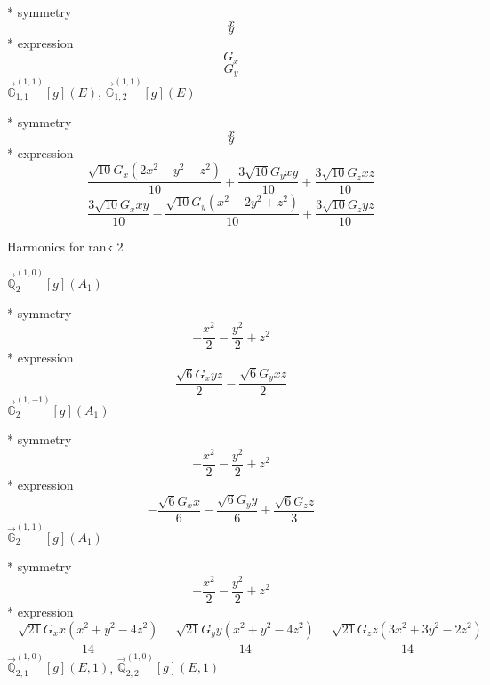 \documentclass[fleqn,8pt]{jsarticle}
\begin{document}
\noindent\quad ** symmetry
\begin{dmath*}
x
\end{dmath*}
\begin{dmath*}
y
\end{dmath*}
\noindent\quad ** expression
\begin{dmath*}
G_{x}
\end{dmath*}
\begin{dmath*}
G_{y}
\end{dmath*}
\noindent\quad $\vec{\mathbb{G}}_{1,1}^{(1,1)}[g](E)$, $\vec{\mathbb{G}}_{1,2}^{(1,1)}[g](E)$

\noindent\quad ** symmetry
\begin{dmath*}
x
\end{dmath*}
\begin{dmath*}
y
\end{dmath*}
\noindent\quad ** expression
\begin{dmath*}
\frac{\sqrt{10} G_{x} \left(2 x^{2} - y^{2} - z^{2}\right)}{10} + \frac{3 \sqrt{10} G_{y} x y}{10} + \frac{3 \sqrt{10} G_{z} x z}{10}
\end{dmath*}
\begin{dmath*}
\frac{3 \sqrt{10} G_{x} x y}{10} - \frac{\sqrt{10} G_{y} \left(x^{2} - 2 y^{2} + z^{2}\right)}{10} + \frac{3 \sqrt{10} G_{z} y z}{10}
\end{dmath*}

\noindent * Harmonics for rank 2

\noindent\quad $\vec{\mathbb{Q}}_{2}^{(1,0)}[g](A_{1})$

\noindent\quad ** symmetry
\begin{dmath*}
- \frac{x^{2}}{2} - \frac{y^{2}}{2} + z^{2}
\end{dmath*}
\noindent\quad ** expression
\begin{dmath*}
\frac{\sqrt{6} G_{x} y z}{2} - \frac{\sqrt{6} G_{y} x z}{2}
\end{dmath*}
\noindent\quad $\vec{\mathbb{G}}_{2}^{(1,-1)}[g](A_{1})$

\noindent\quad ** symmetry
\begin{dmath*}
- \frac{x^{2}}{2} - \frac{y^{2}}{2} + z^{2}
\end{dmath*}
\noindent\quad ** expression
\begin{dmath*}
- \frac{\sqrt{6} G_{x} x}{6} - \frac{\sqrt{6} G_{y} y}{6} + \frac{\sqrt{6} G_{z} z}{3}
\end{dmath*}
\noindent\quad $\vec{\mathbb{G}}_{2}^{(1,1)}[g](A_{1})$

\noindent\quad ** symmetry
\begin{dmath*}
- \frac{x^{2}}{2} - \frac{y^{2}}{2} + z^{2}
\end{dmath*}
\noindent\quad ** expression
\begin{dmath*}
- \frac{\sqrt{21} G_{x} x \left(x^{2} + y^{2} - 4 z^{2}\right)}{14} - \frac{\sqrt{21} G_{y} y \left(x^{2} + y^{2} - 4 z^{2}\right)}{14} - \frac{\sqrt{21} G_{z} z \left(3 x^{2} + 3 y^{2} - 2 z^{2}\right)}{14}
\end{dmath*}
\noindent\quad $\vec{\mathbb{Q}}_{2,1}^{(1,0)}[g](E,1)$, $\vec{\mathbb{Q}}_{2,2}^{(1,0)}[g](E,1)$
\end{document}

